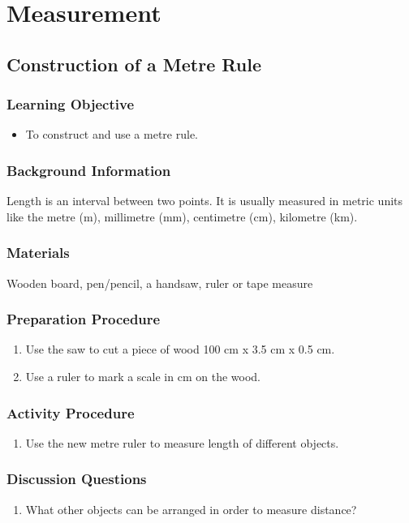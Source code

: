 \section{Measurement}	

\subsection{Construction of a Metre Rule}

\subsubsection*{Learning Objective}
\begin{itemize}
\item{To construct and use a metre rule.} 
\end{itemize}

\subsubsection*{Background Information}
Length is an interval between two points. It is usually measured in metric units like the metre (m), millimetre (mm), centimetre (cm), kilometre (km).

\subsubsection*{Materials}
Wooden board, pen/pencil, a handsaw, ruler or tape measure

\subsubsection*{Preparation Procedure}
\begin{enumerate}
\item{Use the saw to cut a piece of wood 100 cm x 3.5 cm x 0.5 cm.} 
\item{Use a ruler to mark a scale in cm on the wood.} 
\end{enumerate}

\subsubsection*{Activity Procedure}
\begin{enumerate}
\item{Use the new metre ruler to measure length of different objects.} 
\end{enumerate}

\subsubsection*{Discussion Questions}
\begin{enumerate}
\item{What other objects can be arranged in order to measure distance?}
\end{enumerate}

